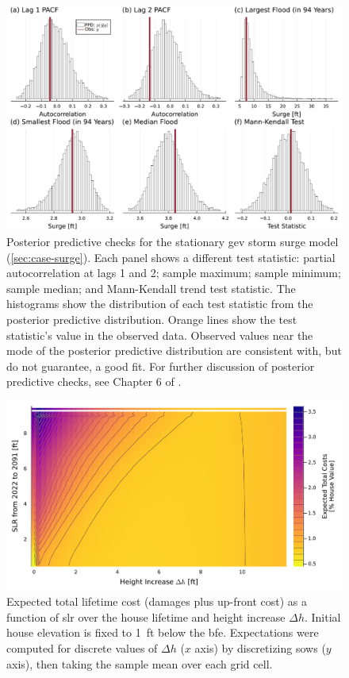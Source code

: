 \documentclass[11pt]{article}
\begin{document}
\begin{figure}
    \centering
    \includegraphics[width=\textwidth]{surge-test-statistics}
    \caption{
        Posterior predictive checks for the stationary \gls{gev} storm surge model (\cref{sec:case-surge}).
        Each panel shows a different test statistic: partial autocorrelation at lags 1 and 2; sample maximum; sample minimum; sample median; and Mann-Kendall trend test statistic.
        The histograms show the distribution of each test statistic from the posterior predictive distribution.
        Orange lines show the test statistic's value in the observed data.
        Observed values near the mode of the posterior predictive distribution are consistent with, but do not guarantee, a good fit.
        For further discussion of posterior predictive checks, see Chapter 6 of \citet{Gelman:2014tc}.
    }\label{fig:surge-test-statistics}
\end{figure}

\begin{figure}
    \includegraphics[width=\textwidth]{scenario-map-height-slr}
    \caption{
        Expected total lifetime cost (damages plus up-front cost) as a function of \gls{slr} over the house lifetime and height increase $\Delta h$.
        Initial house elevation is fixed to \SI{1}{ft} below the \gls{bfe}.
        Expectations were computed for discrete values of $\Delta h$ ($x$ axis) by discretizing \glspl{sow} ($y$ axis), then taking the sample mean over each grid cell.
    }\label{fig:scenario-map-height-slr}
\end{figure}
\end{document}
